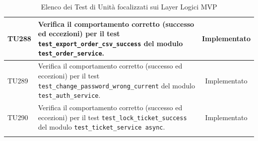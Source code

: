 \documentclass[a4paper,11pt,oneside]{scrartcl}
\begin{document}
\begin{longtable}{|p{1.9cm}|p{11.6cm}|c|}
    TU288 & Verifica il comportamento corretto (successo ed eccezioni) per il test \texttt{test\_export\_order\_csv\_success} del modulo \texttt{test\_order\_service}. & Implementato \\ \hline
    TU289 & Verifica il comportamento corretto (successo ed eccezioni) per il test \texttt{test\_change\_password\_wrong\_current} del modulo \texttt{test\_auth\_service}. & Implementato \\ \hline
    TU290 & Verifica il comportamento corretto (successo ed eccezioni) per il test \texttt{test\_lock\_ticket\_success} del modulo \texttt{test\_ticket\_service     async}. & Implementato \\ \hline
    \caption{Elenco dei Test di Unità focalizzati sui Layer Logici MVP}
\end{longtable}
\end{document}
